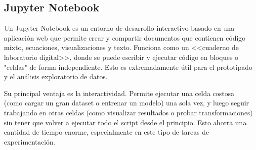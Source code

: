 \subsection{Jupyter Notebook}


Un Jupyter Notebook es un entorno de desarrollo interactivo basado en una aplicación web que permite crear y compartir documentos que contienen código mixto, ecuaciones, visualizaciones y texto. Funciona como un <<cuaderno de laboratorio digital>>, donde se puede escribir y ejecutar código en bloques o "celdas" de forma independiente. Esto es extremadamente útil para el prototipado y el análisis exploratorio de datos.

Su principal ventaja es la interactividad. Permite ejecutar una celda costosa (como cargar un gran dataset o entrenar un modelo) una sola vez, y luego seguir trabajando en otras celdas (como visualizar resultados o probar transformaciones) sin tener que volver a ejecutar todo el script desde el principio. Esto ahorra una cantidad de tiempo enorme, especialmente en este tipo de tareas de experimentación.

